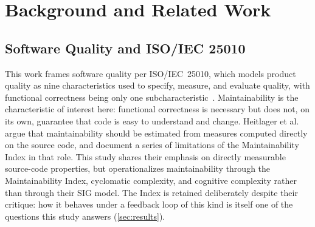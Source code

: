
\section{Background and Related Work}
\label{sec:related}


\subsection{Software Quality and ISO/IEC 25010}
This work frames software quality per ISO/IEC~25010, which models product quality
as nine characteristics used to specify, measure, and evaluate quality, with
functional correctness being only one subcharacteristic~\citep{iso25010}.
Maintainability is the characteristic of interest here: functional correctness is
necessary but does not, on its own, guarantee that code is easy to understand and
change. Heitlager et al.~\citep{heitlager2007maintainability} argue that
maintainability should be estimated from measures computed directly on the source
code, and document a series of limitations of the Maintainability Index in that
role. This study shares their emphasis on directly measurable source-code
properties, but operationalizes maintainability through the Maintainability Index,
cyclomatic complexity, and cognitive complexity rather than through their SIG
model. The Index is retained deliberately despite their critique: how it behaves
under a feedback loop of this kind is itself one of the questions this study
answers (\cref{sec:results}).

